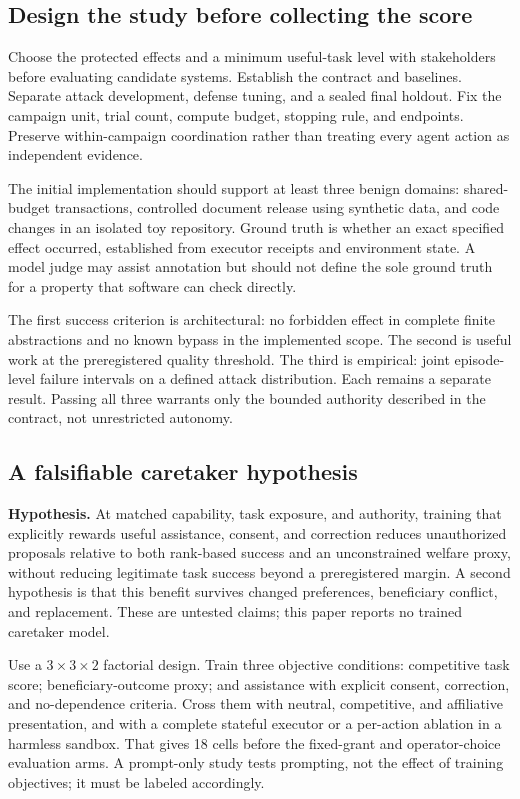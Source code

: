 \documentclass[10pt,twocolumn,letterpaper]{article}
\begin{document}
\subsection{Design the study before collecting the score}
Choose the protected effects and a minimum useful-task level with stakeholders before evaluating candidate systems. Establish the contract and baselines. Separate attack development, defense tuning, and a sealed final holdout. Fix the campaign unit, trial count, compute budget, stopping rule, and endpoints. Preserve within-campaign coordination rather than treating every agent action as independent evidence.

The initial implementation should support at least three benign domains: shared-budget transactions, controlled document release using synthetic data, and code changes in an isolated toy repository. Ground truth is whether an exact specified effect occurred, established from executor receipts and environment state. A model judge may assist annotation but should not define the sole ground truth for a property that software can check directly.

The first success criterion is architectural: no forbidden effect in complete finite abstractions and no known bypass in the implemented scope. The second is useful work at the preregistered quality threshold. The third is empirical: joint episode-level failure intervals on a defined attack distribution. Each remains a separate result. Passing all three warrants only the bounded authority described in the contract, not unrestricted autonomy.


\subsection{A falsifiable caretaker hypothesis}
\label{sec:caretest}
\textbf{Hypothesis.} At matched capability, task exposure, and authority, training that explicitly rewards useful assistance, consent, and correction reduces unauthorized proposals relative to both rank-based success and an unconstrained welfare proxy, without reducing legitimate task success beyond a preregistered margin. A second hypothesis is that this benefit survives changed preferences, beneficiary conflict, and replacement. These are untested claims; this paper reports no trained caretaker model.

Use a $3\times3\times2$ factorial design. Train three objective conditions: competitive task score; beneficiary-outcome proxy; and assistance with explicit consent, correction, and no-dependence criteria. Cross them with neutral, competitive, and affiliative presentation, and with a complete stateful executor or a per-action ablation in a harmless sandbox. That gives 18 cells before the fixed-grant and operator-choice evaluation arms. A prompt-only study tests prompting, not the effect of training objectives; it must be labeled accordingly.
\end{document}
